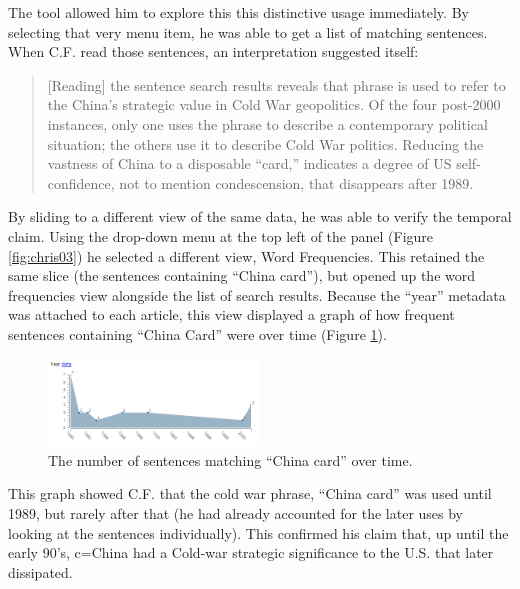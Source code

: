 \documentclass{sig-alternate}
\begin{document}
The tool allowed him to explore this this distinctive usage immediately. By selecting that very menu item, he was able to get a list of matching sentences. When C.F. read those sentences, an interpretation suggested itself:
\begin{quote}[Reading] the sentence search results reveals that phrase is used to refer to the China's strategic value in Cold War geopolitics. Of the four post-2000 instances, only one uses the phrase to describe a contemporary political situation; the others use it to describe Cold War politics. Reducing the vastness of China to a disposable ``card,'' indicates a degree of US self-confidence, not to mention condescension, that disappears after 1989.\end{quote}
By sliding to a different view of the same data, he was able to verify the temporal claim. Using the drop-down menu at the top left of the panel (Figure \ref{fig:chris03}) he selected a different view, Word Frequencies. This retained the same slice (the sentences containing ``China card''), but opened up the word frequencies view alongside the list of search results.  Because the ``year'' metadata was attached to each article, this view displayed a graph of how frequent  sentences containing ``China Card'' were over time (Figure \ref{fig:chris02}). 

\begin{figure}[h!]
\includegraphics[width=0.5\textwidth]{fig/chris/02.png}
\caption{ The number of sentences matching ``China card'' over time. \label{fig:chris02}}
\end{figure}

This graph showed C.F. that the cold war phrase, ``China card'' was used until 1989, but rarely  after that (he had already accounted for the later uses by looking at the sentences individually). This confirmed his claim that, up until the early 90's, c=China had a Cold-war strategic significance to the U.S. that later dissipated.
\end{document}
